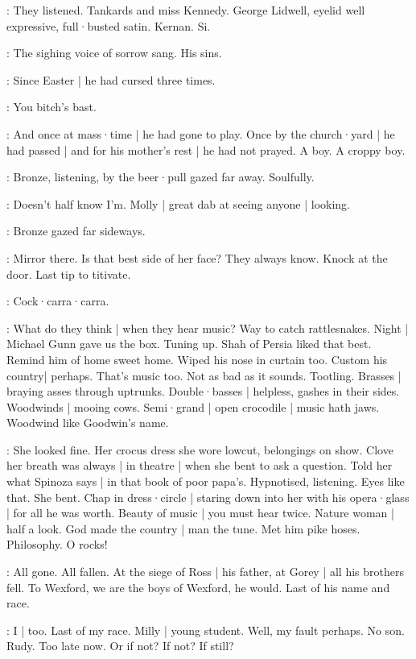 :
They listened.
Tankards and miss Kennedy.
George Lidwell,
eyelid well expressive,
full·busted satin.
Kernan.
Si.

:
The sighing voice of sorrow sang.
His sins.

:
Since Easter |
he had cursed three times.

:
You bitch's bast.

:
And once at mass·time |
he had gone to play.
Once by the church·yard |
he had passed |
and for his mother's rest |
he had not prayed.
A boy.
A croppy boy.

:
Bronze,
listening,
by the beer·pull gazed far away.
Soulfully.

\BloomIntA:
Doesn't half know I'm.
Molly |
great dab at seeing anyone |
looking.

:
Bronze gazed far sideways.

\BloomIntA:
Mirror there.
Is that best side of her face?
They always know.
Knock at the door.
Last tip to titivate.

\BloomIntB:
Cock·carra·carra.

\BloomIntB:
What do they think |
when they hear music?
Way to catch rattle\-snakes.
Night |
Michael Gunn gave us the box.
Tuning up.
Shah of Persia liked that best.
Remind him of home sweet home.
Wiped his nose in curtain too.
Custom his country|
perhaps.
That's music too.
Not as bad as it sounds.
Tootling.
Brasses |
braying asses through uptrunks.
Double·basses |
helpless,
gashes in their sides.
Woodwinds |
mooing cows.
Semi·grand |
open crocodile |
music hath jaws.
Woodwind like Goodwin's name.

\BloomIntB:
She looked fine.
Her crocus dress she wore lowcut,
belongings on show.
Clove her breath was always |
in theatre |
when she bent to ask a question.
Told her what Spinoza says |
in that book of poor papa's.
Hypnotised,
listening.
Eyes like that.
She bent.
Chap in dress·circle |
staring down into her with his opera·glass |
for all he was worth.
Beauty of music |
you must hear twice.
Nature woman |
half a look.
God made the country |
man the tune.
Met him pike hoses.
Philosophy.
O rocks!

:
All gone.
All fallen.
At the siege of Ross |
his father,
at Gorey |
all his brothers fell.
To Wexford,
we are the boys of Wexford,
he would.
Last of his name and race.

\BloomIntB:
I |
too.
Last of my race.
Milly |
young student.
Well,
my fault perhaps.
No son.
Rudy.
Too late now.
Or if not?
If not?
If still?

